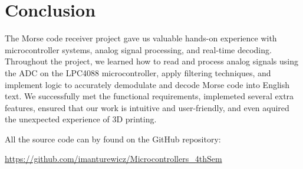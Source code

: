 \documentclass{article}
\begin{document}
\section{Conclusion}
The Morse code receiver project gave us valuable hands-on experience with microcontroller systems, 
analog signal processing, and real-time decoding. Throughout the project, 
we learned how to read and process analog signals using the ADC on the LPC4088 microcontroller, 
apply filtering techniques, and implement logic to accurately demodulate and decode Morse code 
into English text.
We successfully met the functional requirements, implemeted several extra features, ensured 
that our work is intuitive and user-friendly, and even aquired the unexpected experience
of 3D printing.

All the source code can by found on the GitHub repository:
\begin{center}
    \url{https://github.com/imanturewicz/Microcontrollers_4thSem}
\end{center}
\end{document}
